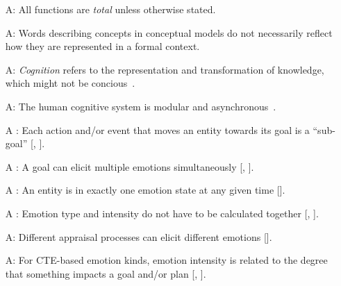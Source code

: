 \begin{itemize}

    \item[A\refstepcounter{assumpnum}\theassumpnum \label{A_TotalFunctions}:]
    All functions are \textit{total} unless otherwise stated.

    \item[A\refstepcounter{assumpnum}\theassumpnum \label{A_formal}:]
    Words describing concepts in conceptual models do not necessarily reflect
    how they are represented in a formal context.

    \item[A\refstepcounter{assumpnum}\theassumpnum \label{A_Cognition}:]
    \textit{Cognition} refers to the representation and transformation of
    knowledge, which might not be concious~\citep[p.~30]{oatley1987towards}.

    \item[A\refstepcounter{assumpnum}\theassumpnum \label{A_Modular}:]
    The human cognitive system is modular and
    asynchronous~\citep[p.~31]{oatley1987towards}.

    \item[A\refstepcounter{assumpnum}\theassumpnum
    \label{A_Subgoal}:] Each action and/or event that moves an entity towards
    its goal is a ``sub-goal'' [,
    ].

    \item[A\refstepcounter{assumpnum}\theassumpnum
    \label{A_Goal2Emotion}:] A goal can elicit multiple emotions simultaneously
    [, ].

    \item[A\refstepcounter{assumpnum}\theassumpnum
    \label{A_OneState}:] An entity is in exactly one emotion state at any given
    time [].

    \item[A\refstepcounter{assumpnum}\theassumpnum
    \label{A_EmotionTypeIntensity}:] Emotion type and intensity do not have to
    be calculated together [,
    ].

    \item[A\refstepcounter{assumpnum}\theassumpnum \label{A_AppraisalProcess}:]
    Different appraisal processes can elicit different emotions
    [].

    \item[A\refstepcounter{assumpnum}\theassumpnum \label{A_Goal2Intensity}:]
    For CTE-based emotion kinds, emotion intensity is related to the degree
    that something impacts a goal and/or plan
    [, ].


\end{itemize}
